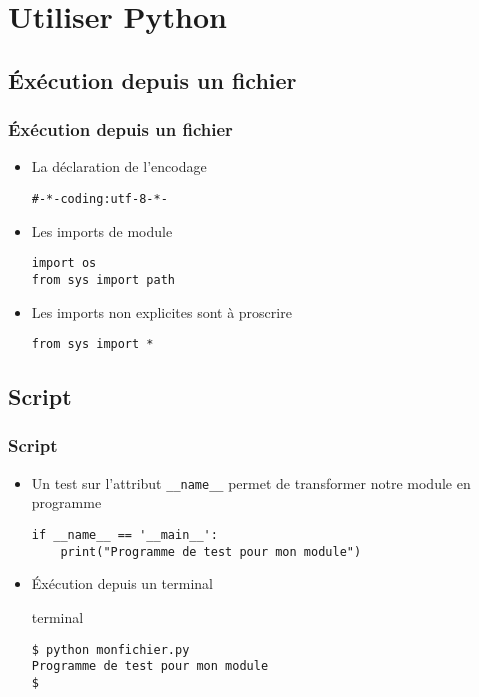 \section{Utiliser Python}

\subsection{Éxécution depuis un fichier}
\begin{frame}[fragile]
  \frametitle{Éxécution depuis un fichier}
  \begin{itemize}
  \item La déclaration de l'encodage
  \begin{lstlisting}
#-*-coding:utf-8-*-
  \end{lstlisting}
  \pause
  \item Les imports de module
  \begin{lstlisting}
import os
from sys import path
  \end{lstlisting}
  \item Les imports non explicites sont à proscrire
  \begin{lstlisting}
from sys import *
  \end{lstlisting}
  \end{itemize}
\end{frame}

\subsection{Script}
\begin{frame}[fragile]
  \frametitle{Script}
  \begin{itemize}
  \item Un test sur l'attribut \verb=__name__=  permet de transformer notre module en programme
  \begin{lstlisting}
if __name__ == '__main__':
    print("Programme de test pour mon module")
  \end{lstlisting}
  \pause
  \item Éxécution depuis un terminal
  \begin{beamercolorbox}{terminal}
\scriptsize\begin{verbatim}$ python monfichier.py
Programme de test pour mon module
$
\end{verbatim}
\end{beamercolorbox}
\end{itemize}
\end{frame}

